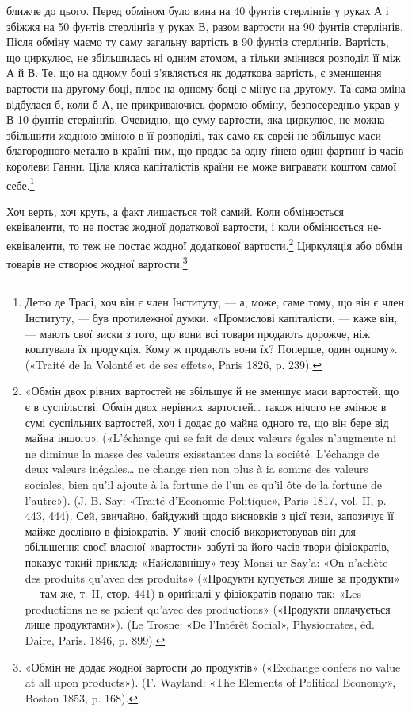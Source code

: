 \parcont{}  %
ближче до цього. Перед обміном було вина на 40 фунтів стерлінґів
у руках А і збіжжя на 50 фунтів стерлінґів у руках В, разом
вартости на 90 фунтів стерлінґів. Після обміну маємо ту саму
загальну вартість в 90 фунтів стерлінґів. Вартість, що циркулює,
не збільшилась ні одним атомом, а тільки змінився розподіл її
між А й В. Те, що на одному боці з’являється як додаткова вартість,
є зменшення вартости на другому боці, плюс на одному
боці є мінус на другому. Та сама зміна відбулася б, коли б А, не
прикриваючись формою обміну, безпосередньо украв у В 10 фунтів
стерлінґів. Очевидно, що суму вартости, яка циркулює, не
можна збільшити жодною зміною в її розподілі, так само як єврей
не збільшує маси благородного металю в країні тим, що продає
за одну ґінею один фартинґ із часів королеви Ганни. Ціла
кляса капіталістів країни не може вигравати коштом самої себе.\footnote{
Детю де Трасі, хоч він є член Інституту, — а, може, саме тому,
що він є член Інституту, — був протилежної думки. «Промислові капіталісти,
— каже він, — мають свої зиски з того, що вони всі товари продають
дорожче, ніж коштувала їх продукція. Кому ж продають вони їх?
Поперше, один одному». («Traité de la Volonté et de ses effets», Paris
1826, p. 239).
}

Хоч верть, хоч круть, а факт лишається той самий. Коли обмінюється
еквіваленти, то не постає жодної додаткової вартости,
і коли обмінюється не-еквіваленти, то теж не постає жодної додаткової
вартости.\footnote{
«Обмін двох рівних вартостей не збільшує й не зменшує маси вартостей,
що є в суспільстві. Обмін двох нерівних вартостей\dots{} також нічого
не змінює в сумі суспільних вартостей, хоч і додає до майна одного те,
що він бере від майна іншого». («L’échange qui se fait de deux valeurs
égales n’augmente ni ne diminue la masse des valeurs exisstantes dans la
société. L’échange de deux valeurs inégales\dots{} ne change rien non plus à ia
somme des valeurs sociales, bien qu’il ajoute à la fortune de l’un ce qu’il
ôte de la fortune de l’autre»). (J. B. Say: «Traité d’Economie Politique»,
Paris 1817, vol. II, p. 443, 444). Сей, звичайно, байдужий щодо висновків
з цієї тези, запозичує її майже дослівно в фізіократів. У який спосіб використовував
він для збільшення своєї власної «вартости» забуті за його
часів твори фізіократів, показує такий приклад: «Найславнішу» тезу
Monsi ur Say’a: «On n’achète des produits qu’avec des produits» («Продукти
купується лише за продукти» — там же, т. II, стор. 441) в ориґіналі
у фізіократів подано так: «Les productions ne se paient qu’avec des
productions» («Продукти оплачується лише продуктами»). (Le Trosne:
«De l’Intérêt Social», Physiocrates, éd. Daire, Paris. 1846, p. 899).
} Циркуляція або обмін товарів не створює
жодної вартости.\footnote{
«Обмін не додає жодної вартости до продуктів» («Exchange confers
no value at all upon products»). (F. Wayland: «The Elements of Political
Economy», Boston 1853, p. 168).
}

